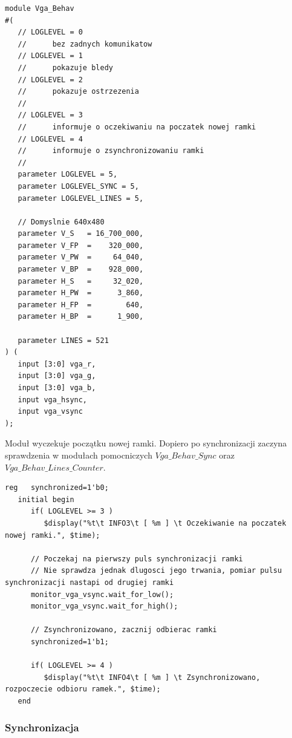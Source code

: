 \documentclass[a4paper,12pt]{article}
\begin{document}
\begin{lstlisting}[label=Vga_behav,caption=Vga\_behav.v]
module Vga_Behav
#(
   // LOGLEVEL = 0
   //      bez zadnych komunikatow
   // LOGLEVEL = 1
   //      pokazuje bledy
   // LOGLEVEL = 2
   //      pokazuje ostrzezenia
   //
   // LOGLEVEL = 3
   //      informuje o oczekiwaniu na poczatek nowej ramki
   // LOGLEVEL = 4
   //      informuje o zsynchronizowaniu ramki
   //
   parameter LOGLEVEL = 5,
   parameter LOGLEVEL_SYNC = 5,
   parameter LOGLEVEL_LINES = 5,

   // Domyslnie 640x480
   parameter V_S   = 16_700_000,
   parameter V_FP  =    320_000,
   parameter V_PW  =     64_040,
   parameter V_BP  =    928_000,
   parameter H_S   =     32_020,
   parameter H_PW  =      3_860,
   parameter H_FP  =        640,
   parameter H_BP  =      1_900,

   parameter LINES = 521
) (
   input [3:0] vga_r,
   input [3:0] vga_g,
   input [3:0] vga_b,
   input vga_hsync,
   input vga_vsync
);
\end{lstlisting}

Moduł wyczekuje początku nowej ramki. Dopiero po synchronizacji zaczyna sprawdzenia w modułach pomocniczych $Vga\_Behav\_Sync$ oraz $Vga\_Behav\_Lines\_Counter$.
\begin{lstlisting}[label=Vga_Behav,caption=Vga\_Behav.v,firstnumber=47]
   reg   synchronized=1'b0;
   initial begin
      if( LOGLEVEL >= 3 )
         $display("%t\t INFO3\t [ %m ] \t Oczekiwanie na poczatek nowej ramki.", $time);

      // Poczekaj na pierwszy puls synchronizacji ramki
      // Nie sprawdza jednak dlugosci jego trwania, pomiar pulsu synchronizacji nastapi od drugiej ramki
      monitor_vga_vsync.wait_for_low();
      monitor_vga_vsync.wait_for_high();

      // Zsynchronizowano, zacznij odbierac ramki
      synchronized=1'b1;

      if( LOGLEVEL >= 4 )
         $display("%t\t INFO4\t [ %m ] \t Zsynchronizowano, rozpoczecie odbioru ramek.", $time);
   end
\end{lstlisting}

\subsubsection{Synchronizacja}
\end{document}
